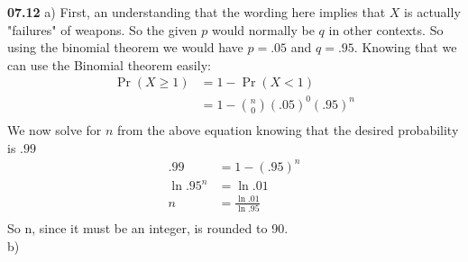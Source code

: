 {\bf 07.12} \quad a) First, an understanding that the wording here implies that $X$ is actually "failures" of weapons. So the given $p$ would normally be $q$ in other contexts. So using the binomial theorem we would have $p = .05$ and $q = .95$. Knowing that we can use the Binomial theorem easily:
\begin{align*}
	\Pr \left( X \geq 1 \right) & = 1 - \Pr \left( X < 1 \right ) \\
	& = 1 - {n \choose 0} (.05)^0 (.95)^{n} \\
\end{align*}
We now solve for $n$ from the above equation knowing that the desired probability is $.99$ \\
\begin{align*}
	.99 & = 1 - (.95)^{n} \\
	\ln .95^{n} & = \ln .01 \\
	n & = \frac{\ln .01}{\ln .95} \\
\end{align*}
So n, since it must be an integer, is rounded to 90.
\\
b)
